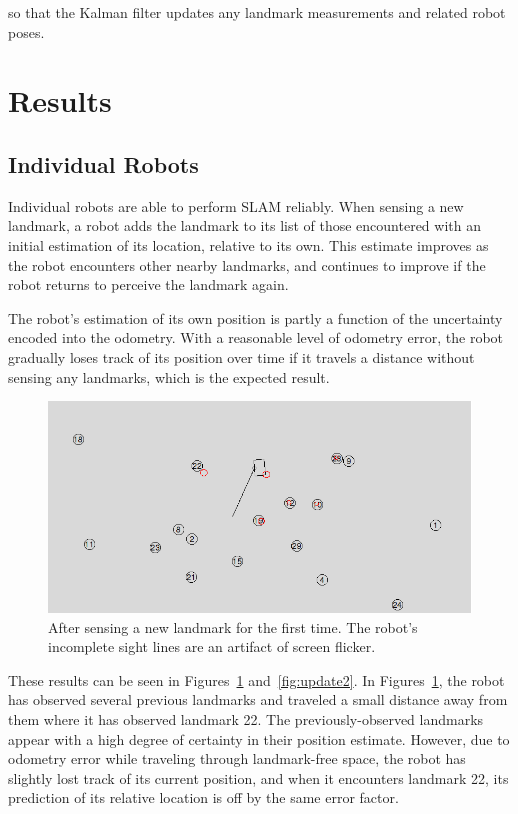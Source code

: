\documentclass[prodmode,acmtecs]{acmsmall} %
\begin{document}
so that the Kalman filter updates any landmark measurements and related robot poses.

\section{Results}

\subsection{Individual Robots}

Individual robots are able to perform SLAM reliably.  When sensing a new landmark, a robot adds the landmark to its list of those encountered with an initial estimation of its location, relative to its own.  This estimate improves as the robot encounters other nearby landmarks, and continues to improve if the robot returns to perceive the landmark again.

The robot's estimation of its own position is partly a function of the uncertainty encoded into the odometry.  With a reasonable level of odometry error, the robot gradually loses track of its position over time if it travels a distance without sensing any landmarks, which is the expected result.

\begin{figure}[h!]
\includegraphics[width=\textwidth]{update1.png}
\caption{After sensing a new landmark for the first time.  The robot's incomplete sight lines are an artifact of screen flicker.}
\label{fig:update1}
\end{figure}

These results can be seen in Figures~\ref{fig:update1} and~\ref{fig:update2}.  In Figures~\ref{fig:update1}, the robot has observed several previous landmarks and traveled a small distance away from them where it has observed landmark 22.  The previously-observed landmarks appear with a high degree of certainty in their position estimate.  However, due to odometry error while traveling through landmark-free space, the robot has slightly lost track of its current position, and when it encounters landmark 22, its prediction of its relative location is off by the same error factor.
\end{document}

